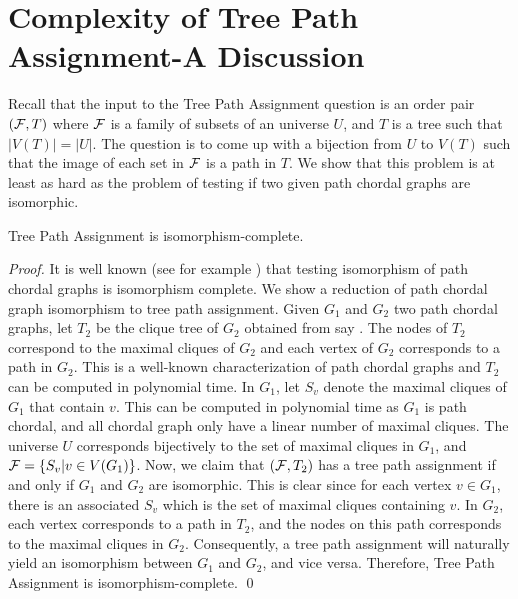 \documentclass{llncs}
\def\cF{{\cal F}}
\begin{document}
\section{Complexity of Tree Path Assignment-A Discussion} \label{complexity}
Recall that the input to the Tree Path Assignment question is an order
pair $(\cF,T)$ where $\cF$ is a family of subsets of an universe $U$,
and $T$ is a tree such that $|V(T)| = |U|$.  The question is to come
up with a bijection from 
$U$ to $V(T)$ such that the image of each set in $\cF$ is a path in
$T$.  We show that this problem is at least as hard as the problem of
testing if two given path chordal graphs are isomorphic.   
\begin{theorem} \label{thm:isocomp}
Tree Path Assignment is isomorphism-complete.
\end{theorem}
\begin{proof}
  It is well known (see for example \cite{kklv10}) that testing
  isomorphism of path chordal graphs is isomorphism complete.  We show
  a reduction of path chordal graph isomorphism to tree path
  assignment.  Given $G_1$ and $G_2$ two path chordal graphs, let
  $T_2$ be the clique tree of $G_2$ obtained from say \cite{gav78}.
  The nodes of $T_2$ correspond to the maximal cliques of $G_2$ and
  each vertex of $G_2$ corresponds to a path in $G_2$.  This is a
  well-known characterization of path chordal graphs and $T_2$ can be
  computed in polynomial time.  In $G_1$, let $S_v$ denote the maximal
  cliques of $G_1$ that contain $v$.  This can be computed in
  polynomial time as $G_1$ is path chordal, and all chordal graph only
  have a linear number of maximal cliques.  The universe $U$
  corresponds bijectively to the set of maximal cliques in $G_1$, and
  $\cF = \{S_v | v \in V(G_1)\}$.  Now, we claim that $(\cF, T_2)$ has
  a tree path assignment if and only if $G_1$ and $G_2$ are
  isomorphic.  This is clear since for each vertex $v \in G_1$, there
  is an associated $S_v$ which is the set of maximal cliques
  containing $v$.  In $G_2$, each vertex corresponds to a path in
  $T_2$, and the nodes on this path corresponds to the maximal cliques
  in $G_2$.  Consequently, a tree path assignment will naturally yield
  an isomorphism between $G_1$ and $G_2$, and vice versa.  Therefore,
  Tree Path Assignment is isomorphism-complete. \qed
\end{proof}
\end{document}
